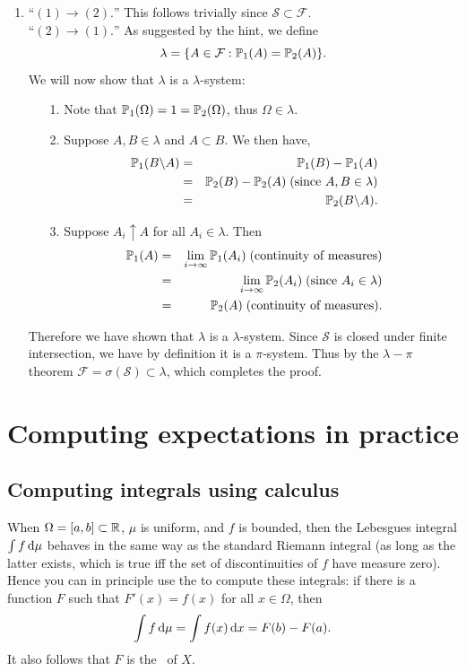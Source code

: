 \documentclass{article}
\begin{document}
\begin{enumerate}
	\item ``$(1)\rightarrow (2).$'' This follows trivially since $\mathcal{S}\subset\mathcal{F}$.\\
	\newline
	``$(2)\rightarrow (1).$'' As suggested by the hint, we define 
	\[\lambda=\{A\in\mathcal{F}:\P_1(A)=\P_2(A)\}.\]
	We will now show that $\lambda$ is a $\lambda$-system:
	\begin{enumerate}
		\item [1.] Note that $\P_1(\Omega)=1=\P_2(\Omega)$, thus $\Omega\in \lambda$.
		\item [2.] Suppose $A,B\in\lambda$ and $A\subset B$. We then have,
			\begin{eqnarray*}
			\P_1(B\backslash A)&=&\P_1(B)-\P_1(A) \\
			&=& \P_2(B)-\P_2(A) \;\text{(since }A,B\in\lambda) \\
			&=& \P_2(B\backslash A).
			\end{eqnarray*}
		\item [3.] Suppose $A_i\uparrow A$ for all $A_i\in\lambda$. Then
			\begin{eqnarray*}
			\P_1(A)&=&\lim_{i\to\infty} \P_1(A_i) \;\text{(continuity of measures}) \\
			&=& \lim_{i\to\infty}\P_2(A_i) \;\text{(since }A_i\in\lambda) \\
			&=&\P_2(A) \;\text{(continuity of measures}). \\
			\end{eqnarray*}
	\end{enumerate}
	Therefore we have shown that $\lambda$ is a $\lambda$-system. Since $\mathcal{S}$ is closed under finite intersection, we have by definition it is a $\pi$-system. Thus by the $\lambda-\pi$ theorem $\mathcal{F}=\sigma(\mathcal{S})\subset\lambda$, which completes the proof.
\end{enumerate}



\section{Computing expectations in practice}

\subsection{Computing integrals using calculus}\label{sec:calculus}

When $\Omega = [a, b] \subset \R$, $\mu$ is uniform, and $f$ is bounded, then the Lebesgues integral $\int f \ud \mu$ behaves in the same way as the standard Riemann integral (as long as the latter exists, which is true iff the set of discontinuities of $f$ have measure zero). Hence you can in principle use the  to compute these integrals: if there is a function $F$ such that $F'(x) = f(x)$ for all $x \in \Omega$, then 
\[ \int f \ud \mu = \int f(x) \ud x = F(b) - F(a). \]
It also follows that $F$ is the \CDF\ of $X$.  
\end{document}
